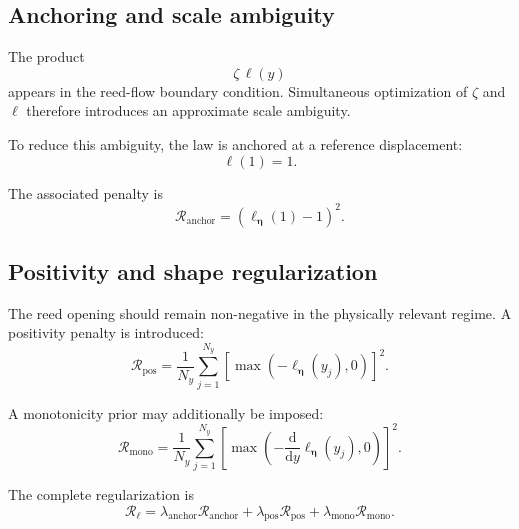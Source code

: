 \documentclass[11pt,a4paper]{report}
\theoremstyle{plain}
\theoremstyle{definition}
\begin{document}
\subsection{Anchoring and scale ambiguity}

The product
\begin{equation}
\zeta\,\ell(y)
\end{equation}
appears in the reed-flow boundary condition. Simultaneous optimization of
\(\zeta\) and \(\ell\) therefore introduces an approximate scale ambiguity.

To reduce this ambiguity, the law is anchored at a reference displacement:
\begin{equation}
\ell(1)=1.
\label{eq:lfunc_anchor}
\end{equation}

The associated penalty is
\begin{equation}
\mathcal{R}_{\mathrm{anchor}}
=
\left(
\ell_{\boldsymbol{\eta}}(1)-1
\right)^2.
\label{eq:anchor_regularization}
\end{equation}

\subsection{Positivity and shape regularization}

The reed opening should remain non-negative in the physically relevant regime.
A positivity penalty is introduced:
\begin{equation}
\mathcal{R}_{\mathrm{pos}}
=
\frac{1}{N_y}
\sum_{j=1}^{N_y}
\left[
\max
\left(
-\ell_{\boldsymbol{\eta}}(y_j),0
\right)
\right]^2.
\label{eq:positivity_regularization}
\end{equation}

A monotonicity prior may additionally be imposed:
\begin{equation}
\mathcal{R}_{\mathrm{mono}}
=
\frac{1}{N_y}
\sum_{j=1}^{N_y}
\left[
\max
\left(
-\frac{\mathrm{d}}{\mathrm{d}y}
\ell_{\boldsymbol{\eta}}(y_j),0
\right)
\right]^2.
\label{eq:monotonicity_regularization}
\end{equation}

The complete regularization is
\begin{equation}
\mathcal{R}_\ell
=
\lambda_{\mathrm{anchor}}
\mathcal{R}_{\mathrm{anchor}}
+
\lambda_{\mathrm{pos}}
\mathcal{R}_{\mathrm{pos}}
+
\lambda_{\mathrm{mono}}
\mathcal{R}_{\mathrm{mono}}.
\label{eq:lfunc_regularization}
\end{equation}
\end{document}
